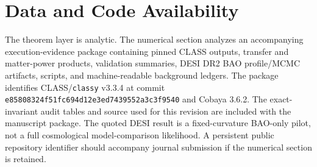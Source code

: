 \documentclass[aps,prd,preprint,onecolumn,nofootinbib,superscriptaddress,showkeys]{revtex4-2}
\numberwithin{equation}{section}
\theoremstyle{definition}
\theoremstyle{plain}
\begin{document}
\section*{Data and Code Availability}

The theorem layer is analytic.  The numerical section analyzes an accompanying execution-evidence package containing pinned CLASS outputs, transfer and matter-power products, validation summaries, DESI DR2 BAO profile/MCMC artifacts, scripts, and machine-readable background ledgers.  The package identifies CLASS/\texttt{classy} v3.3.4 at commit \texttt{e85808324f51fc694d12e3ed7439552a3c3f9540} and Cobaya 3.6.2.  The exact-invariant audit tables and source used for this revision are included with the manuscript package.  The quoted DESI result is a fixed-curvature BAO-only pilot, not a full cosmological model-comparison likelihood.  A persistent public repository identifier should accompany journal submission if the numerical section is retained.
\end{document}
